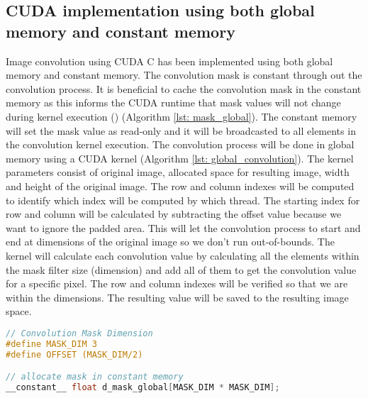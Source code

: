 \subsection{CUDA implementation using both global memory and constant memory}
Image convolution using CUDA C has been implemented using both global memory and constant memory. The convolution mask is constant through out the convolution process. It is beneficial to cache the convolution mask in the constant memory as this informs the CUDA runtime that mask values will not change during kernel execution (\cite{parallel}) (Algorithm \ref{lst: mask_global}). The constant memory will set the mask value as read-only and it will be broadcasted to all elements in the convolution kernel execution. The convolution process will be done in global memory using a CUDA kernel (Algorithm \ref{lst: global_convolution}). The kernel parameters consist of original image, allocated space for resulting image, width and height of the original image. The row and column indexes will be computed to identify which index will be computed by which thread. The starting index for row and column will be calculated by subtracting the offset value because we want to ignore the padded area. This will let the convolution process to start and end at dimensions of the original image so we don't run out-of-bounds. The kernel will calculate each convolution value by calculating all the elements within the mask filter size (dimension) and add all of them to get the convolution value for a specific pixel. The row and column indexes will be verified so that we are within the dimensions. The resulting value will be saved to the resulting image space.


\begin{lstlisting}[language=C, label={lst: mask_global}, caption= Cache mask in to the constant memory]
// Convolution Mask Dimension
#define MASK_DIM 3
#define OFFSET (MASK_DIM/2)

// allocate mask in constant memory
__constant__ float d_mask_global[MASK_DIM * MASK_DIM];
\end{lstlisting}


